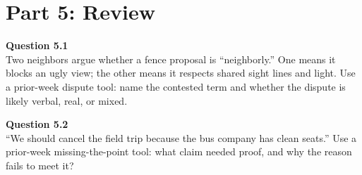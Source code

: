 \documentclass[12pt]{article}
\begin{document}

\newpage

\section*{Part 5: Review}

\textbf{Question 5.1}\\[-0.15em]
Two neighbors argue whether a fence proposal is ``neighborly.'' One means it blocks an ugly view; the other means it respects shared sight lines and light. Use a prior-week dispute tool: name the contested term and whether the dispute is likely verbal, real, or mixed.


\textbf{Question 5.2}\\[-0.15em]
``We should cancel the field trip because the bus company has clean seats.'' Use a prior-week missing-the-point tool: what claim needed proof, and why the reason fails to meet it?

\end{document}

